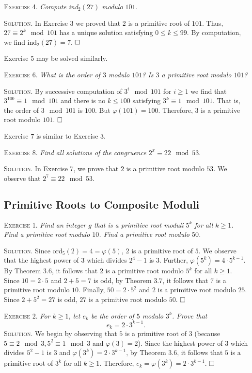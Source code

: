 \documentclass[11pt, leqno]{article}
\newcommand{\done}{\ensuremath{\hfill\square}}
\begin{document}
\textsc{Exercise 4}. \emph{Compute \emph{ind}$_2(27)$ modulo $101$.}

\textsc{Solution}. In Exercise 3 we proved that $2$ is a primitive root of $101$. Thus, $27 \equiv 2^k \mod 101$ has a unique solution satisfying $0\leq k \leq 99$. By computation, we find ind$_2(27) = 7$. \done

Exercise 5 may be solved similarly.

\textsc{Exercise 6}. \emph{What is the order of $3$ modulo $101$? Is $3$ a primitive root modulo $101$?}

\textsc{Solution}. By successive computation of $3^i \mod 101$ for $i\geq 1$ we find that $3^{100}\equiv 1 \mod 101$ and there is no $k\leq 100$ satisfying $3^k \equiv 1 \mod 101$. That is, the order of $3 \mod 101$ is $100$. But $\varphi(101) = 100$. Therefore, $3$ is a primitive root modulo $101$. \done

Exercise 7 is similar to Exercise 3.

\textsc{Exercise 8}. \emph{Find all solutions of the congruence $2^x \equiv 22 \mod 53$}.

\textsc{Solution}. In Exercise 7, we prove that $2$ is a primitive root modulo $53$. We observe that $2^7 \equiv 22 \mod 53$. 

\subsection{Primitive Roots to Composite Moduli}

\textsc{Exercise 1}. \emph{Find an integer $g$ that is a primitive root moduli $5^k$ for all $k \geq 1$. Find a primitive root modulo $10$. Find a primitive root modulo $50$.}

\textsc{Solution}. Since ord$_5(2) = 4 = \varphi(5)$, $2$ is a primitive root of $5$. We observe that the highest power of $3$ which divides $2^4-1$ is $3$. Further, $\varphi(5^k) = 4\cdot 5^{k-1}$. By Theorem $3.6$, it follows that $2$ is a primitive root modulo $5^k$ for all $k\geq 1$. Since $10 = 2\cdot 5$ and $2+5 = 7 $ is odd, by Theorem $3.7$, it follows that $7$ is a primitive root modulo $10$. Finally, $50 = 2 \cdot 5^2$ and $2$ is a primitive root modulo $25$. Since $2+5^2 = 27$ is odd, $27$ is a primitive root modulo $50$. \done

\textsc{Exercise 2}. \emph{For $k \geq 1$, let $e_k$ be the order of $5$ modulo $3^k$. Prove that 
\begin{displaymath}
e_k = 2\cdot 3^{k-1}.
\end{displaymath}}\textsc{Solution}. We begin by observing that $5$ is a primitive root of $3$ (because $5 \equiv 2 \mod 3, 5^2 \equiv 1 \mod 3$ and $\varphi(3) = 2$). Since the highest power of $3$ which divides $5^2-1$ is $3$ and $\varphi(3^k) = 2\cdot 3^{k-1}$, by Theorem $3.6$, it follows that $5$ is a primitive root of $3^k$ for all $k\geq 1$. Therefore, $e_k = \varphi(3^k) = 2\cdot 3^{k-1}$. \done
\end{document}
